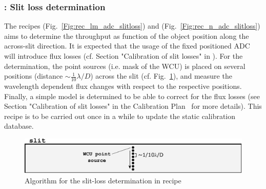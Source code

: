 \clearpage
\subsubsection{: Slit loss determination }\label{sssec:adc_slitlosses}
The recipes  (Fig.~\ref{Fig:rec_lm_adc_slitloss}) and  (Fig.~\ref{Fig:rec_n_adc_slitloss}) aims to determine the throughput as function of the object position along the across-slit direction. It is expected that the usage of the fixed positioned \ac{ADC} will introduce flux losses (cf. Section "Calibration of slit losses" in  \cite{METIS-calibration_plan}). For the determination, the point sources (i.e. mask of the \ac{WCU}) is placed on several positions (distance $\sim\frac{1}{10}\lambda/D$) across the slit (cf. Fig.~\ref{Fig:slitloss}), and measure the wavelength dependent flux changes with respect to the respective positions. Finally, a simple model is determined to be able to correct for the flux losses  (see Section "Calibration of slit losses" in the Calibration Plan~\cite{METIS-calibration_plan} for more details). This recipe is to be carried out once in a while to update the static calibration database.
\begin{figure}[ht]
  \centering
  \includegraphics[width=0.5\textheight]{figures/slitloss_det.pdf}
  \caption[slitloss determination]{Algorithm for the slit-loss determination in recipe  }
  \label{Fig:slitloss}
\end{figure}


